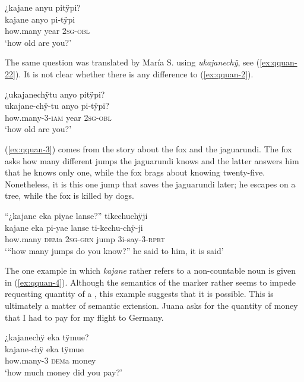 \ea\label{ex:qquan-2}
\begingl
\glpreamble ¿kajane anyu pitÿpi?\\
\gla kajane anyo pi-tÿpi\\
\glb how.many year 2\textsc{sg}-\textsc{obl}\\
\glft ‘how old are you?’
\endgl
\trailingcitation{[dxx-d120416s.073]}
\xe

The same question was translated by María S. using \textit{ukajanechÿ}, see (\ref{ex:qquan-22}). It is not clear whether there is any difference to (\ref{ex:qquan-2}).

\ea\label{ex:qquan-22}
\begingl
\glpreamble ¿ukajanechÿtu anyo pitÿpi?\\
\gla ukajane-chÿ-tu anyo pi-tÿpi?\\
\glb how.many-3-\textsc{iam} year 2\textsc{sg}-\textsc{obl}\\
\glft ‘how old are you?’
\endgl
\trailingcitation{[rxx-e151017l]}
\xe

(\ref{ex:qquan-3}) comes from the story about the fox and the jaguarundi. The fox asks how many different jumps the jaguarundi knows and the latter answers him that he knows only one, while the fox brags about knowing twenty-five. Nonetheless, it is this one jump that saves the jaguarundi later; he escapes on a tree, while the fox is killed by dogs.

\ea\label{ex:qquan-3}
\begingl
\glpreamble “¿kajane eka piyae lanse?” tikechuchÿji\\
\gla kajane eka pi-yae lanse ti-kechu-chÿ-ji\\
\glb how.many \textsc{dem}a 2\textsc{sg}-\textsc{grn} jump 3i-say-3-\textsc{rprt}\\
\glft ‘“how many jumps do you know?” he said to him, it is said’
\endgl
\trailingcitation{[jmx-n120429ls-x5.355]}
\xe

The one example in which \textit{kajane} rather refers to a non-countable noun is given in (\ref{ex:qquan-4}).  Although the semantics of the  marker rather seems to impede requesting quantity of a , this example suggests that it is possible. This is ultimately a matter of semantic extension.
Juana asks for the quantity of money that I had to pay for my flight to Germany.

\ea\label{ex:qquan-4}
\begingl
\glpreamble ¿kajanechÿ eka tÿmue?\\
\gla kajane-chÿ eka tÿmue\\
\glb how.many-3 \textsc{dem}a money\\
\glft ‘how much money did you pay?’
\endgl
\trailingcitation{[jxx-p120430l-1.157]}
\xe

